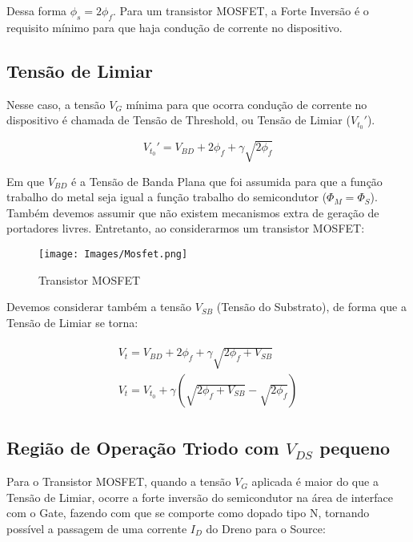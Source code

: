 \documentclass[12pt]{article}
\begin{document}
Dessa forma $\phi_s = 2 \phi_f$. Para um transistor MOSFET, a Forte Inversão é o requisito mínimo para que haja condução de corrente no dispositivo.

\subsection{Tensão de Limiar}

Nesse caso, a tensão $V_G$ mínima para que ocorra condução de corrente no dispositivo é chamada de Tensão de Threshold, ou Tensão de Limiar ($V_{t_0}'$).

$$
  V_{t_0} ' = V_{BD} + 2 \phi_f + \gamma \sqrt{2 \phi_f}
$$

Em que $V_{BD}$ é a Tensão de Banda Plana que foi assumida para que a função trabalho do metal seja igual a função trabalho do semicondutor ($\Phi_M = \Phi_S$). Também devemos assumir que não existem mecanismos extra de geração de portadores livres.
Entretanto, ao considerarmos um transistor MOSFET:

\begin{figure}[H]
  \begin{center}
    \texttt{[image: Images/Mosfet.png]}
  \end{center}
  \caption{Transistor MOSFET}
\end{figure}

Devemos considerar também a tensão $V_{SB}$ (Tensão do Substrato), de forma que a Tensão de Limiar se torna:

\begin{align*}
  \begin{split}
    V_t = V_{BD} + 2 \phi_f + \gamma \sqrt{2 \phi_f + V_{SB}} \\[0.5cm]
    V_t = V_{t_0} + \gamma ( \sqrt{2 \phi_f + V_{SB}} - \sqrt{2 \phi_f}  )
  \end{split}
\end{align*}

\subsection{Região de Operação Triodo com $V_{DS}$ pequeno}

Para o Transistor MOSFET, quando a tensão $V_G$ aplicada é maior do que a Tensão de Limiar, ocorre a forte inversão do semicondutor na área de interface com o Gate, fazendo com que se comporte como dopado tipo N, tornando possível a passagem de uma corrente $I_D$ do Dreno para o Source:
\end{document}
